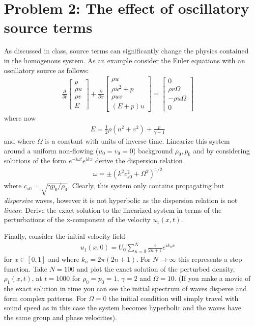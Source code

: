 \documentclass[11pt]{article}
\begin{document}
\section*{Problem 2: The effect of oscillatory source terms}

As discussed in class, source terms can significantly change the
physics contained in the homogenous system. As an example consider the
Euler equations with an oscillatory source as follows:
\begin{align*}
  \frac{\partial}{\partial{t}}
  \left[
    \begin{matrix}
      \rho \\
      \rho u \\
      \rho v \\      
      E
    \end{matrix}
  \right]
  +
  \frac{\partial}{\partial{x}}
  \left[
    \begin{matrix}
      \rho u \\
      \rho u^2 + p \\
      \rho u v \\
      (E+p)u
    \end{matrix}
  \right]
  =
  \left[
    \begin{matrix}
      0 \\
      \rho v\Omega \\
      -\rho u\Omega  \\
      0
    \end{matrix}
  \right]  
\end{align*}
where now
\begin{align*}
  E = \frac{1}{2}\rho (u^2+v^2) + \frac{p}{\gamma-1}
\end{align*}
and where $\Omega$ is a constant with units of inverse time. Linearize
this system around a uniform non-flowing ($u_0 = v_0 = 0$) background
$\rho_0, p_0$ and by considering solutions of the form
$e^{-i\omega t}e^{i kx }$ derive the dispersion relation
\begin{align*}
  \omega = \pm (k^2 c_{s0}^2 + \Omega^2)^{1/2}
\end{align*}
where $c_{s0} = \sqrt{\gamma p_0/\rho_0}$. Clearly, this system only
contains propagating but \emph{dispersive} waves, however it is not
hyperbolic as the dispersion relation is not \emph{linear}. Derive the
exact solution to the linearized system in terms of the perturbations
of the x-component of the velocity $u_1(x,t)$.

Finally, consider the initial velocity field
\begin{align*}
  u_1(x,0) = U_0 \sum_{n=0}^N \frac{i}{2n + 1} e^{i k_n x}
\end{align*}
for $x\in [0,1]$ and where $k_n = 2\pi (2n+1)$. For
$N\rightarrow \infty$ this represents a step function. Take $N=100$
and plot the exact solution of the perturbed density, $\rho_1(x,t)$,
at $t=1000$ for $\rho_0 = p_0 = 1$, $\gamma = 2$ and $\Omega =
10$. (If you make a movie of the exact solution in time you can see
the initial spectrum of waves disperse and form complex patterns. For
$\Omega = 0$ the initial condition will simply travel with sound speed
as in this case the system becomes hyperbolic and the waves have the
same group and phase velocities).
\end{document}
